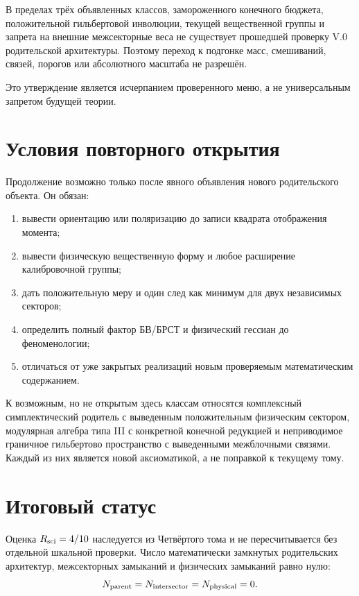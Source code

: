 \begin{theorem}
В пределах трёх объявленных классов, замороженного конечного бюджета,
положительной гильбертовой инволюции, текущей вещественной группы и запрета
на внешние межсекторные веса не существует прошедшей проверку V.0
родительской архитектуры. Поэтому переход к подгонке масс, смешиваний,
связей, порогов или абсолютного масштаба не разрешён.
\end{theorem}

Это утверждение является исчерпанием проверенного меню, а не универсальным
запретом будущей теории.

\section{Условия повторного открытия}

Продолжение возможно только после явного объявления нового родительского
объекта. Он обязан:
\begin{enumerate}
 \item вывести ориентацию или поляризацию до записи квадрата отображения
 момента;
 \item вывести физическую вещественную форму и любое расширение
 калибровочной группы;
 \item дать положительную меру и один след как минимум для двух независимых
 секторов;
 \item определить полный фактор БВ/БРСТ и физический гессиан до
 феноменологии;
 \item отличаться от уже закрытых реализаций новым проверяемым
 математическим содержанием.
\end{enumerate}

К возможным, но не открытым здесь классам относятся комплексный
симплектический родитель с выведенным положительным физическим сектором,
модулярная алгебра типа III с конкретной конечной редукцией и неприводимое
граничное гильбертово пространство с выведенными межблочными связями.
Каждый из них является новой аксиоматикой, а не поправкой к текущему тому.

\section{Итоговый статус}

Оценка \(R_{\rm sci}=4/10\) наследуется из Четвёртого тома и не
пересчитывается без отдельной шкальной проверки. Число математически
замкнутых родительских архитектур, межсекторных замыканий и физических
замыканий равно нулю:
\begin{equation}
 N_{\rm parent}=N_{\rm intersector}=N_{\rm physical}=0.
\end{equation}

